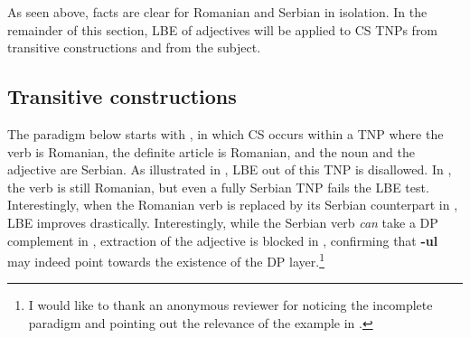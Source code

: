 \documentclass[output=paper,hidelinks,newtxmath,]{langscibook}
\begin{document}
\noindent As seen above, facts are clear for Romanian and Serbian in isolation. In the remainder of this section, LBE of adjectives will be applied to CS TNPs from transitive constructions and from the subject.

\subsection{Transitive constructions}\label{15:s5.2}

The paradigm below starts with , in which CS occurs within a TNP where the verb is Romanian, the definite article is Romanian, and the noun and the adjective are Serbian. As illustrated in , LBE out of this TNP is disallowed. In , the verb is still Romanian, but even a fully Serbian TNP fails the LBE test. Interestingly, when the Romanian verb is replaced by its Serbian counterpart in , LBE improves drastically. Interestingly, while the Serbian verb \textit{can} take a DP complement in , extraction of the adjective is blocked in , confirming that \textbf{-ul} may indeed point towards the existence of the DP layer.\footnote{\label{15:fn9}I would like to thank an anonymous reviewer for noticing the incomplete paradigm and pointing out the relevance of the example in .}

\ea \label{15:ex16}
	\z
\z

\ea \label{15:ex17}
	\z
\z
\end{document}
